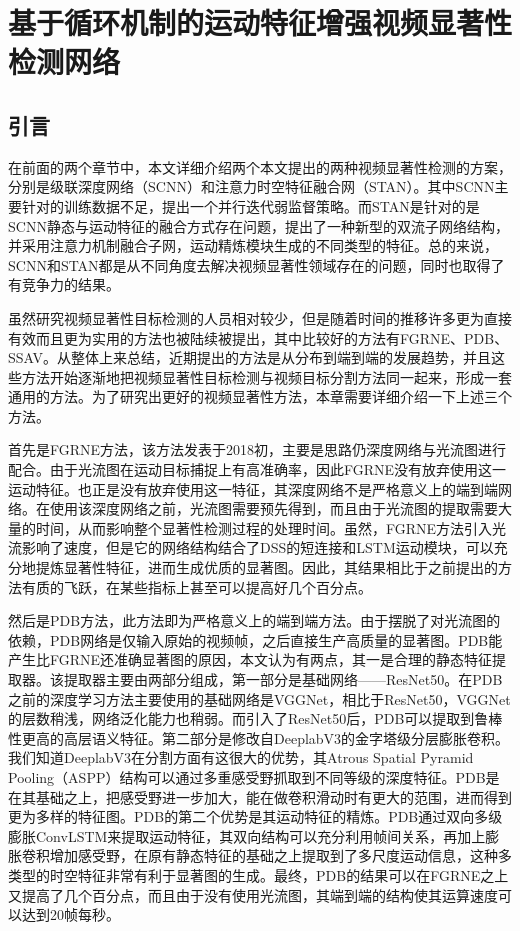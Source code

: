 \chapter{基于循环机制的运动特征增强视频显著性检测网络}
\renewcommand{\leftmark}{第四章\quad 基于循环机制的运动特征增强视频显著性检测网络}

\section{引言}
在前面的两个章节中，本文详细介绍两个本文提出的两种视频显著性检测的方案，分别是级联深度网络（SCNN）和注意力时空特征融合网（STAN）。其中SCNN主要针对的训练数据不足，提出一个并行迭代弱监督策略。而STAN是针对的是SCNN静态与运动特征的融合方式存在问题，提出了一种新型的双流子网络结构，并采用注意力机制融合子网，运动精炼模块生成的不同类型的特征。总的来说，SCNN和STAN都是从不同角度去解决视频显著性领域存在的问题，同时也取得了有竞争力的结果。

虽然研究视频显著性目标检测的人员相对较少，但是随着时间的推移许多更为直接有效而且更为实用的方法也被陆续被提出，其中比较好的方法有FGRNE\cite{li2018flow}、PDB\cite{song2018pyramid}、SSAV\cite{Fan_2019_CVPR}。从整体上来总结，近期提出的方法是从分布到端到端的发展趋势，并且这些方法开始逐渐地把视频显著性目标检测与视频目标分割方法同一起来，形成一套通用的方法。为了研究出更好的视频显著性方法，本章需要详细介绍一下上述三个方法。

首先是FGRNE方法，该方法发表于2018初，主要是思路仍深度网络与光流图进行配合。由于光流图在运动目标捕捉上有高准确率，因此FGRNE没有放弃使用这一运动特征。也正是没有放弃使用这一特征，其深度网络不是严格意义上的端到端网络。在使用该深度网络之前，光流图需要预先得到，而且由于光流图的提取需要大量的时间，从而影响整个显著性检测过程的处理时间。虽然，FGRNE方法引入光流影响了速度，但是它的网络结构结合了DSS的短连接和LSTM运动模块，可以充分地提炼显著性特征，进而生成优质的显著图。因此，其结果相比于之前提出的方法有质的飞跃，在某些指标上甚至可以提高好几个百分点。

然后是PDB方法，此方法即为严格意义上的端到端方法。由于摆脱了对光流图的依赖，PDB网络是仅输入原始的视频帧，之后直接生产高质量的显著图。PDB能产生比FGRNE还准确显著图的原因，本文认为有两点，其一是合理的静态特征提取器。该提取器主要由两部分组成，第一部分是基础网络——ResNet50。在PDB之前的深度学习方法主要使用的基础网络是VGGNet，相比于ResNet50，VGGNet的层数稍浅，网络泛化能力也稍弱。而引入了ResNet50后，PDB可以提取到鲁棒性更高的高层语义特征。第二部分是修改自DeeplabV3\cite{chen2017rethinking}的金字塔级分层膨胀卷积。我们知道DeeplabV3在分割方面有这很大的优势，其Atrous Spatial Pyramid Pooling（ASPP）结构可以通过多重感受野抓取到不同等级的深度特征。PDB是在其基础之上，把感受野进一步加大，能在做卷积滑动时有更大的范围，进而得到更为多样的特征图。PDB的第二个优势是其运动特征的精炼。PDB通过双向多级膨胀ConvLSTM来提取运动特征，其双向结构可以充分利用帧间关系，再加上膨胀卷积增加感受野，在原有静态特征的基础之上提取到了多尺度运动信息，这种多类型的时空特征非常有利于显著图的生成。最终，PDB的结果可以在FGRNE之上又提高了几个百分点，而且由于没有使用光流图，其端到端的结构使其运算速度可以达到20帧每秒。

